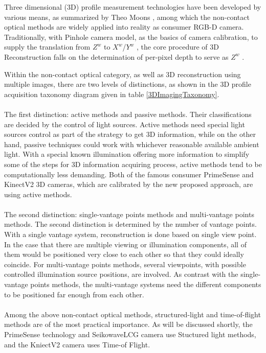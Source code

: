 %
\noindent
Three dimensional (3D) profile measurement technologies have been developed by various means, as summarized by Theo Moons \cite{CourseNotes}, among which the non-contact optical methods are widely applied into reality as consumer RGB-D camera. Traditionally, with Pinhole camera model, as the basics of camera calibration, to supply the translation from \(Z^{w}\)  to \(X^{w}\)/\(Y^{w}\) , the core procedure of 3D Reconstruction falls on the determination of per-pixel depth to serve as \(Z^{w}\) .\par%
%
\noindent
Within the non-contact optical category, as well as 3D reconstruction using multiple images, there are two levels of distinctions, as shown in the 3D profile acquisition taxonomy diagram \cite{Reconstruction10} given in table \ref{3DImagingTaxonomy}.
 \\\\The first distinction: active methods and passive methods. Their classifications are decided by the control of light sources. Active methods need special light sources control as part of the strategy to get 3D information, while on the other hand, passive techniques could work with whichever reasonable available ambient light. With a special known illumination offering more information to simplify some of the steps for 3D information acquiring process, active methods tend to be computationally less demanding. Both of the famous consumer PrimeSense and KinectV2 3D cameras, which are calibrated by the new proposed approach, are using active methods.
\\\\The second distinction: single-vantage points methods and multi-vantage points methods. The second distinction is determined by the number of vantage points. With a single vantage system, reconstruction is done based on single view point. In the case that there are multiple viewing or illumination components, all of them would be positioned very close to each other so that they could ideally coincide. For multi-vantage points methods, several viewpoints, with possible controlled illumination source positions, are involved. As contrast with the single-vantage points methods, the multi-vantage systems need the different components to be positioned far enough from each other. 
\\ \\
Among the above non-contact optical methods, structured-light and time-of-flight methods are of the most practical importance.
As will be discussed shortly, the PrimeSense technology and SeikowaveLCG camera use Stuctured light methods, and the KniectV2 camera uses Time-of Flight. 
